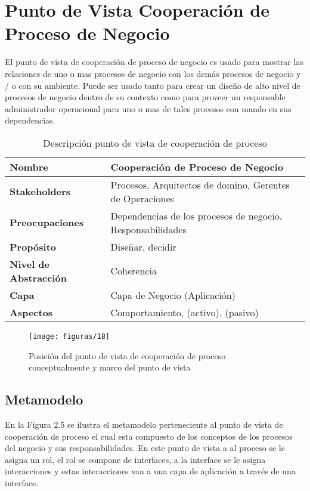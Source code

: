   \section{Punto de Vista Cooperación de Proceso de Negocio}
  El punto de vista de cooperación de proceso de negocio es usado para mostrar las relaciones
  de uno o mas procesos de negocio con los demás procesos de negocio y / o con su ambiente. Puede ser usado tanto para crear un diseño de alto nivel de procesos de negocio dentro de su contexto como para proveer un responsable administrador operacional para uno o mas de tales procesos con mando en sus dependencias.
  
  \begin{table}[H]
  	\centering
  	\begin{tabular}{p{3.7cm}p{8cm}}
  		\hline
  		\rowcolor[HTML]{0073a1}
  		{\color[HTML]{FFFFFF} \textbf{Nombre}} & {\color[HTML]{FFFFFF} \textbf{Cooperación de Proceso de Negocio}} \\
  		\hline
  		\textbf{Stakeholders} & Procesos, Arquitectos de domino, Gerentes de Operaciones \\
  		\textbf{Preocupaciones} & Dependencias de los procesos de negocio, Responsabilidades \\
  		\textbf{Propósito} & Diseñar, decidir \\
  		\textbf{Nivel de Abstracción} & Coherencia \\
  		\textbf{Capa} & Capa de Negocio (Aplicación) \\
  		\textbf{Aspectos} & Comportamiento, (activo), (pasivo) \\
  		\bottomrule
  	\end{tabular}
  	\captionsetup{width=.95\textwidth}
  	\caption{Descripción punto de vista de cooperación de proceso}
  	\label{tabla8}
  \end{table}
  
  \begin{figure}[H]
  	\centering
  	\texttt{[image: figuras/18]}
  	\captionsetup{width=.95\textwidth}
  	\caption{Posición del punto de vista de cooperación de proceso conceptualmente y marco del punto de vista}
  	\label{figura18}
  \end{figure}
  
  \subsection{Metamodelo}
  En la Figura 2.5 se ilustra el metamodelo perteneciente al punto de vista de cooperación de proceso el cual esta compuesto de los conceptos de los procesos del negocio y sus responsabilidades. En este punto de vista a al proceso se le asigna un rol, el rol se compone de interfaces, a la interface se le asigna interacciones y estas interacciones van a una capa de aplicación a través de una interface.
  

